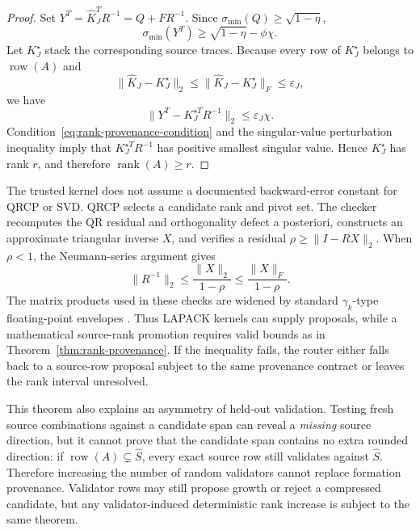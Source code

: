 \documentclass[11pt]{article}
\theoremstyle{definition}
\begin{document}
\begin{proof}
Set $Y^T=\widehat K_J^TR^{-1}=Q+FR^{-1}$. Since
$\sigma_{\min}(Q)\ge\sqrt{1-\eta}$,
\[
 \sigma_{\min}(Y^T)\ge\sqrt{1-\eta}-\phi\chi.
\]
Let $K_J^\star$ stack the corresponding source traces. Because every row of $K_J^\star$ belongs to $\operatorname{row}(A)$ and
\[
 \|\widehat K_J-K_J^\star\|_2
 \le \|\widehat K_J-K_J^\star\|_F
 \le \varepsilon_J,
\]
we have
\[
 \|Y^T-K_J^{\star T}R^{-1}\|_2\le\varepsilon_J\chi.
\]
Condition~\eqref{eq:rank-provenance-condition} and the singular-value perturbation inequality imply that $K_J^{\star T}R^{-1}$ has positive smallest singular value. Hence $K_J^\star$ has rank $r$, and therefore $\operatorname{rank}(A)\ge r$.
\end{proof}

The trusted kernel does not assume a documented backward-error constant for QRCP or SVD. QRCP selects a candidate rank and pivot set. The checker recomputes the QR residual and orthogonality defect a posteriori, constructs an approximate triangular inverse $X$, and verifies a residual $\rho\ge\|I-RX\|_2$. When $\rho<1$, the Neumann-series argument gives
\[
 \|R^{-1}\|_2\le \frac{\|X\|_2}{1-\rho}
 \le \frac{\|X\|_F}{1-\rho}.
\]
The matrix products used in these checks are widened by standard $\gamma_k$-type floating-point envelopes \citep{Higham2002}. Thus LAPACK kernels can supply proposals, while a mathematical source-rank promotion requires valid bounds as in Theorem~\ref{thm:rank-provenance}. If the inequality fails, the router either falls back to a source-row proposal subject to the same provenance contract or leaves the rank interval unresolved.

This theorem also explains an asymmetry of held-out validation. Testing fresh source combinations against a candidate span can reveal a \emph{missing} source direction, but it cannot prove that the candidate span contains no extra rounded direction: if $\operatorname{row}(A)\subsetneq\widehat S$, every exact source row still validates against $\widehat S$. Therefore increasing the number of random validators cannot replace formation provenance. Validator rows may still propose growth or reject a compressed candidate, but any validator-induced deterministic rank increase is subject to the same theorem.
\end{document}
